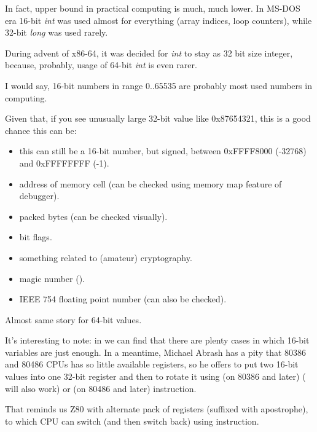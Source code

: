 In fact, upper bound in practical computing is much, much lower.
In MS-DOS era 16-bit \emph{int} was used almost for everything (array indices, loop counters),
while 32-bit \emph{long} was used rarely.

During advent of x86-64, it was decided for \emph{int} to stay as 32 bit size integer, because, probably,
usage of 64-bit \emph{int} is even rarer.

I would say, 16-bit numbers in range 0..65535 are probably most used numbers in computing.

Given that, if you see unusually large 32-bit value like 0x87654321, this is a good chance this can be:

\begin{itemize}

\item this can still be a 16-bit number, but signed, between 0xFFFF8000 (-32768) and 0xFFFFFFFF (-1).
\item address of memory cell (can be checked using memory map feature of debugger).
\item packed bytes (can be checked visually).
\item bit flags.
\item something related to (amateur) cryptography.
\item magic number ().
\item IEEE 754 floating point number (can also be checked).

\end{itemize}

Almost same story for 64-bit values.


It's interesting to note: in 
we can find that there are plenty cases in which 16-bit variables are just enough.
In a meantime, Michael Abrash has a pity that 80386 and 80486 CPUs has so little available registers, so he offers to put
two 16-bit values into one 32-bit register and then to rotate it using
 (on 80386 and later) ( will also work) or 
 (on 80486 and later) instruction.

That reminds us Z80 with alternate pack of registers (suffixed with apostrophe), to which CPU can switch
(and then switch back) using  instruction.

